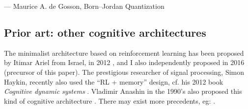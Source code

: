 \documentclass[orivec]{llncs}
\begin{document}
--- Maurice A. de Gosson, Born–Jordan Quantization

\subsection{Prior art: other cognitive architectures}

The minimalist architecture based on reinforcement learning has been proposed by Itimar Ariel from Israel, in 2012 \cite{Arel2012}, and I also independently proposed in 2016 (precursor of this paper).  The prestigious researcher of signal processing, Simon Haykin, recently also used the ``RL + memory'' design, cf. his 2012 book \textit{Cognitive dynamic systems} \cite{Haykin2012}. Vladimir Anashin in the 1990's also proposed this kind of cognitive architecture \cite{Anashin2009}.  There may exist more precedents, eg: \cite{Ivancevic2006}.
\end{document}
